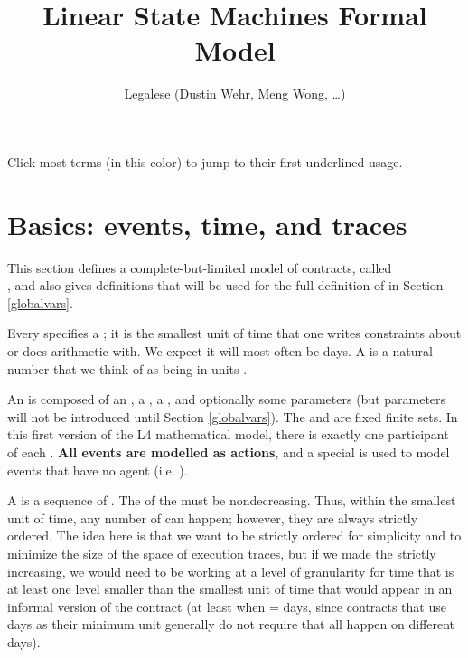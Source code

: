 \documentclass[12pt]{article}
\author{Legalese (Dustin Wehr, Meng Wong, \ldots)}
\title{Linear State Machines Formal Model}
\begin{document}
\maketitle



\noindent Click most terms (in \color{TermColor}this color\color{black}) to jump to their first underlined usage.

\tableofcontents



\section{Basics: events, time, and traces} \label{basics}

This section defines a complete-but-limited model of contracts, called \\ , and also gives definitions that will be used for the full definition of  in Section \ref{globalvars}.

Every \Contract specifies a ; it is the smallest unit of time that one writes constraints about or does arithmetic with. We expect it will most often be days. A  is a natural number that we think of as being in units \TimeUnit.

An  is composed of an , a , a \TimeStamp, and optionally some parameters (but parameters will not be introduced until Section \ref{globalvars}). The \Actions and \Roles are fixed finite sets. In this first version of the L4 mathematical model, there is exactly one participant of each \Role.
{\bf All events are modelled as actions}, and a special \Role {}  is used to model events that have no agent (i.e. \Role).

A  is a sequence of \Events. The \TimeStamps of the \Events must be nondecreasing. Thus, within the smallest unit of time, any number of \Events can happen; however, they are always strictly ordered. The idea here is that we want \Events to be strictly ordered for simplicity and to minimize the size of the space of execution traces, but if we made the \TimeStamps strictly increasing, we would need to be working at a level of granularity for time that is at least one level smaller than the smallest unit of time that would appear in an informal version of the contract (at least when \TimeUnit = days, since contracts that use days as their minimum unit generally do not require that all \Events happen on different days).
\end{document}
